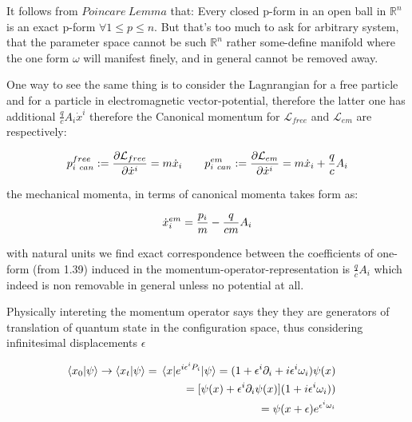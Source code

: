 \documentclass[8pt, twocoloumn]{article}
\begin{document}
It follows from $Poincare \ Lemma$ that: Every closed p-form in an open ball in $\mathbb{R}^n$ is an exact p-form $\forall 1 \leq p \leq n$. But that's too much to ask for arbitrary system, that the parameter space cannot be such $\mathbb{R}^n$ rather some-define manifold where the one form $\omega$ will manifest finely, and in general cannot be removed away.

One way to see the same thing is to consider the Lagnrangian for a free particle and for a particle in electromagnetic vector-potential, therefore the latter one has additional $\frac{q}{c}A_i \dot{x}^i$ therefore the Canonical momentum for $\mathcal{L}_{free}$ and $\mathcal{L}_{em}$ are respectively:

\begin{align}
\begin{split}
p_{i \ can}^{free} := \frac{\partial \mathcal{L}_{free}}{\partial \dot{x}^{i}}  =m\dot{x}_{i} \ \ \ \ \ \ p_{i \ can}^{em} := \frac{\partial \mathcal{L}_{em}}{\partial \dot{x}^{i}} = m\dot{x}_{i}+\frac{q}{c}A_i \notag
\end{split} \\
\end{align}

the mechanical momenta, in terms of canonical momenta takes form as: 


\begin{align}{\label{hiii}}
\dot{x}^{em}_{i} = \frac{p_i}{m} - \frac{q}{cm}A_i 
\end{align}

with natural units we find exact correspondence between the coefficients of one-form (from 1.39) induced in the momentum-operator-representation is  $\frac{q}{c}A_i $ which indeed is non removable in general unless no potential at all.



Physically intereting the momentum operator says they they are generators of translation of quantum state in the configuration space, thus considering infinitesimal displacements $\epsilon $

\begin{align}
\begin{split}
\braket{x_0 |\psi} \to \braket{x_t|\psi} = {}& \braket{x|e^{i \epsilon^iP_i}|\psi} = (1+\epsilon^i \partial_i + i \epsilon^i \omega_i) \psi(x) \notag 
\end{split} \\
   \begin{split}
       ={}& [\psi(x)+\epsilon^i \partial_i \psi(x)](1+i \epsilon^i \omega_i))  \notag 
   \end{split} \\
\begin{split}
={}& \psi(x + \epsilon)e^{\epsilon^i \omega_i}
 \end{split}
 \end{align}
 
\end{document}
